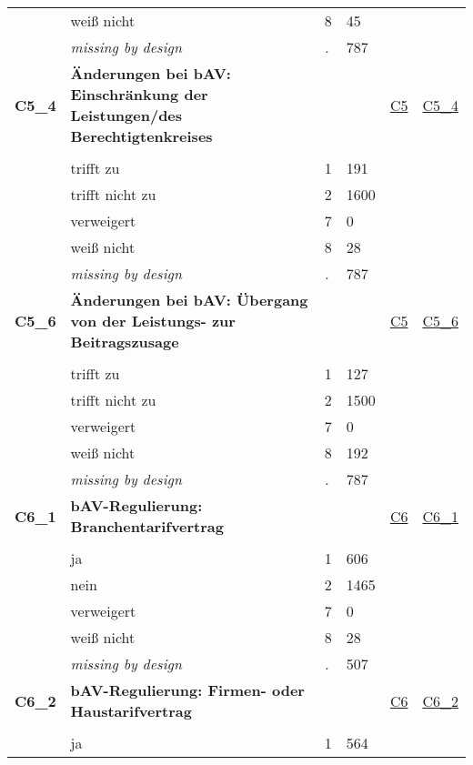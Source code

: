 \begin{longtable}{| L{2.45cm} | L{6cm} | C{1.5cm} | R{1cm} | C{2.25cm} | C{2.25cm} |}
   & weiß nicht & 8 & 45 &  &  \\ 
   & \textit{missing by design} & \textit{.} & 787 &  &  \\ 
   \midrule
\textbf{C5\_4}\label{var:C5:4} & \textbf{Änderungen bei bAV: Einschränkung der Leistungen/des Berechtigtenkreises} &  &  & \hyperref[C5]{C5} & \hyperref[var:suf:C5:4]{C5\_4} \\ 
   &  &  &  &  &  \\ 
   & trifft zu & 1 & 191 &  &  \\ 
   & trifft nicht zu & 2 & 1600 &  &  \\ 
   & verweigert & 7 & 0 &  &  \\ 
   & weiß nicht & 8 & 28 &  &  \\ 
   & \textit{missing by design} & \textit{.} & 787 &  &  \\ 
   \midrule
\textbf{C5\_6}\label{var:C5:6} & \textbf{Änderungen bei bAV: Übergang von der Leistungs- zur Beitragszusage} &  &  & \hyperref[C5]{C5} & \hyperref[var:suf:C5:6]{C5\_6} \\ 
   &  &  &  &  &  \\ 
   & trifft zu & 1 & 127 &  &  \\ 
   & trifft nicht zu & 2 & 1500 &  &  \\ 
   & verweigert & 7 & 0 &  &  \\ 
   & weiß nicht & 8 & 192 &  &  \\ 
   & \textit{missing by design} & \textit{.} & 787 &  &  \\ 
   \midrule
\textbf{C6\_1}\label{var:C6:1} & \textbf{bAV-Regulierung: Branchentarifvertrag} &  &  & \hyperref[C6]{C6} & \hyperref[var:suf:C6:1]{C6\_1} \\ 
   &  &  &  &  &  \\ 
   & ja & 1 & 606 &  &  \\ 
   & nein & 2 & 1465 &  &  \\ 
   & verweigert & 7 & 0 &  &  \\ 
   & weiß nicht & 8 & 28 &  &  \\ 
   & \textit{missing by design} & \textit{.} & 507 &  &  \\ 
   \midrule
\textbf{C6\_2}\label{var:C6:2} & \textbf{bAV-Regulierung: Firmen- oder Haustarifvertrag} &  &  & \hyperref[C6]{C6} & \hyperref[var:suf:C6:2]{C6\_2} \\ 
   &  &  &  &  &  \\ 
   & ja & 1 & 564 &  &  \\ 

\end{longtable}
